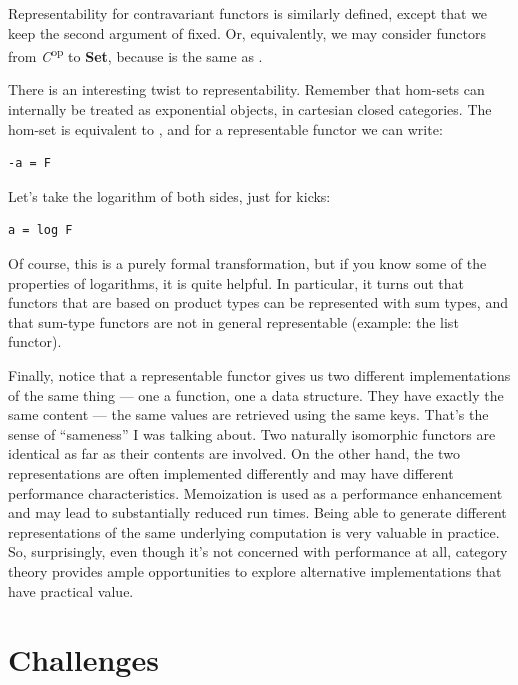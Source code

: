 Representability for contravariant functors is similarly defined, except
that we keep the second argument of  fixed. Or,
equivalently, we may consider functors from \emph{C}\textsuperscript{op}
to \textbf{Set}, because  is the same as
.

There is an interesting twist to representability. Remember that
hom-sets can internally be treated as exponential objects, in cartesian
closed categories. The hom-set  is equivalent to
, and for a representable functor  we can write:

\begin{Verbatim}[commandchars=\\\{\}]
-a = F
\end{Verbatim}

Let's take the logarithm of both sides, just for kicks:

\begin{Verbatim}[commandchars=\\\{\}]
a = log F
\end{Verbatim}

Of course, this is a purely formal transformation, but if you know some
of the properties of logarithms, it is quite helpful. In particular, it
turns out that functors that are based on product types can be
represented with sum types, and that sum-type functors are not in
general representable (example: the list functor).

Finally, notice that a representable functor gives us two different
implementations of the same thing --- one a function, one a data
structure. They have exactly the same content --- the same values are
retrieved using the same keys. That's the sense of ``sameness'' I was
talking about. Two naturally isomorphic functors are identical as far as
their contents are involved. On the other hand, the two representations
are often implemented differently and may have different performance
characteristics. Memoization is used as a performance enhancement and
may lead to substantially reduced run times. Being able to generate
different representations of the same underlying computation is very
valuable in practice. So, surprisingly, even though it's not concerned
with performance at all, category theory provides ample opportunities to
explore alternative implementations that have practical value.

\section{Challenges}\label{challenges}

